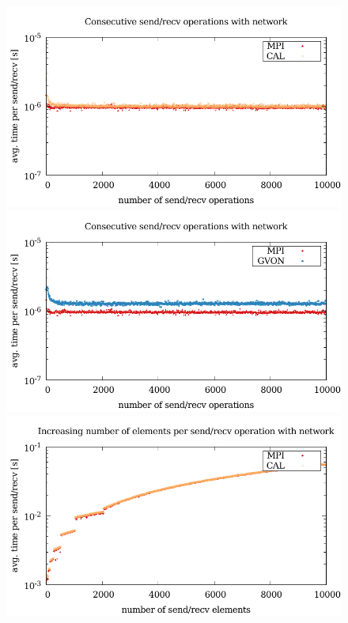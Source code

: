 \begin{figure}[H]
  \begin{minipage}[t]{0.5\textwidth}
    \includegraphics[width=\textwidth]{plots/50_nsend_network_cal_laser}
    \includegraphics[width=\textwidth]{plots/50_nsend_network_gvon_laser}
    \includegraphics[width=\textwidth]{plots/50_nsize_network_cal_laser}

\end{minipage}
\end{figure}
